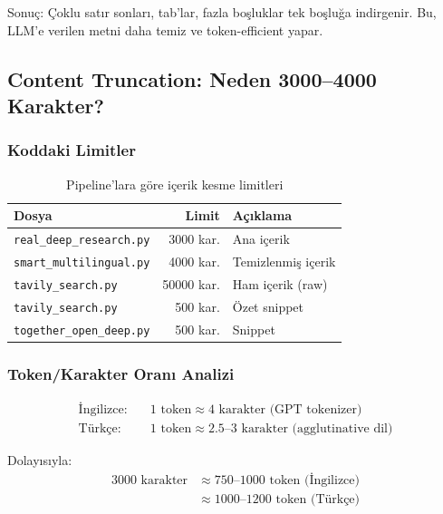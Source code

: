 \noindent
Sonu\c{c}: \c{C}oklu sat{\i}r sonlar{\i}, tab'lar, fazla bo\c{s}luklar tek bo\c{s}lu\u{g}a indirgenir. Bu, LLM'e verilen metni daha temiz ve token-efficient yapar.


\subsection{Content Truncation: Neden 3000--4000 Karakter?}
\label{subsec:truncation}

\subsubsection{Koddaki Limitler}

\begin{table}[H]
\centering
\caption{Pipeline'lara g\"{o}re i\c{c}erik kesme limitleri}
\label{tab:truncation}
\begin{tabularx}{\textwidth}{lrX}
\toprule
\color{chapterBlue}\textbf{Dosya} &
\color{chapterBlue}\textbf{Limit} &
\color{chapterBlue}\textbf{A\c{c}{\i}klama} \\
\midrule
\texttt{real\_deep\_research.py} & 3000 kar. & Ana i\c{c}erik \\
\texttt{smart\_multilingual.py}  & 4000 kar. & Temizlenmi\c{s} i\c{c}erik \\
\texttt{tavily\_search.py}       & 50000 kar. & Ham i\c{c}erik (raw) \\
\texttt{tavily\_search.py}       & 500 kar. & \"{O}zet snippet \\
\texttt{together\_open\_deep.py}  & 500 kar. & Snippet \\
\bottomrule
\end{tabularx}
\end{table}

\subsubsection{Token/Karakter Oran{\i} Analizi}

\begin{formulbox}
\begin{align}
\text{\.{I}ngilizce:} \quad & 1 \text{ token} \approx 4 \text{ karakter (GPT tokenizer)} \label{eq:token-en} \\
\text{T\"{u}rk\c{c}e:}    \quad & 1 \text{ token} \approx 2.5\text{--}3 \text{ karakter (agglutinative dil)} \label{eq:token-tr}
\end{align}

Dolay{\i}s{\i}yla:
\begin{align*}
3000 \text{ karakter} &\approx 750\text{--}1000 \text{ token (\.{I}ngilizce)} \\
                      &\approx 1000\text{--}1200 \text{ token (T\"{u}rk\c{c}e)}
\end{align*}
\end{formulbox}

